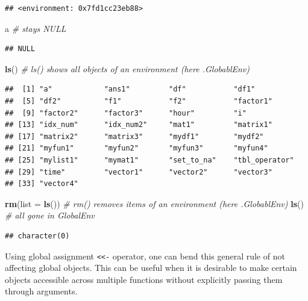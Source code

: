 \documentclass[]{book}
\newenvironment{Shaded}{\begin{snugshade}}{\end{snugshade}}
\newcommand{\KeywordTok}[1]{\textcolor[rgb]{0.13,0.29,0.53}{\textbf{{#1}}}}
\newcommand{\DataTypeTok}[1]{\textcolor[rgb]{0.13,0.29,0.53}{{#1}}}
\newcommand{\CommentTok}[1]{\textcolor[rgb]{0.56,0.35,0.01}{\textit{{#1}}}}
\newcommand{\NormalTok}[1]{{#1}}
\theoremstyle{definition}
\theoremstyle{definition}
\theoremstyle{remark}
\begin{document}
\begin{verbatim}
## <environment: 0x7fd1cc23eb88>
\end{verbatim}

\begin{Shaded}
\begin{Highlighting}[]
\NormalTok{a  }\CommentTok{# stays NULL }
\end{Highlighting}
\end{Shaded}

\begin{verbatim}
## NULL
\end{verbatim}

\begin{Shaded}
\begin{Highlighting}[]
\KeywordTok{ls}\NormalTok{()  }\CommentTok{# ls() shows all objects of an environment (here .GlobablEnv)}
\end{Highlighting}
\end{Shaded}

\begin{verbatim}
##  [1] "a"            "ans1"         "df"           "df1"         
##  [5] "df2"          "f1"           "f2"           "factor1"     
##  [9] "factor2"      "factor3"      "hour"         "i"           
## [13] "idx_num"      "idx_num2"     "mat1"         "matrix1"     
## [17] "matrix2"      "matrix3"      "mydf1"        "mydf2"       
## [21] "myfun1"       "myfun2"       "myfun3"       "myfun4"      
## [25] "mylist1"      "mymat1"       "set_to_na"    "tbl_operator"
## [29] "time"         "vector1"      "vector2"      "vector3"     
## [33] "vector4"
\end{verbatim}

\begin{Shaded}
\begin{Highlighting}[]
\KeywordTok{rm}\NormalTok{(}\DataTypeTok{list =} \KeywordTok{ls}\NormalTok{())  }\CommentTok{# rm() removes items of an  environment (here .GlobablEnv)}
\KeywordTok{ls}\NormalTok{()  }\CommentTok{# all gone in GlobalEnv}
\end{Highlighting}
\end{Shaded}

\begin{verbatim}
## character(0)
\end{verbatim}

Using global assignment \texttt{\textless{}\textless{}-} operator, one
can bend this general rule of not affecting global objects. This can be
useful when it is desirable to make certain objects accessible across
multiple functions without explicitly passing them through arguments.
\end{document}
